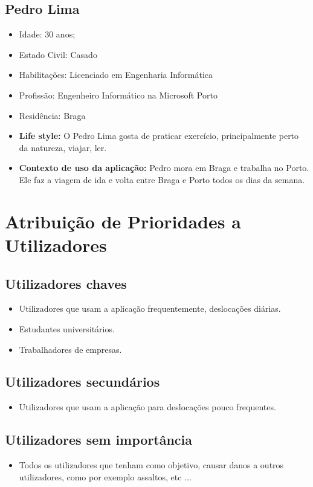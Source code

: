\subsection{Pedro Lima}
\begin{itemize}
    \item Idade: 30 anos;
    \item Estado Civil: Casado
    \item Habilitações: Licenciado em Engenharia Informática
    \item Profissão: Engenheiro Informático na Microsoft Porto
    \item Residência: Braga
    \item \textbf{Life style:} O Pedro Lima gosta de praticar exercício, principalmente perto da natureza, viajar, ler. 
    \item \textbf{Contexto de uso da aplicação:} Pedro mora em Braga e trabalha no Porto. Ele faz a viagem de ida e volta entre Braga e Porto todos os dias da semana.
    
\end{itemize}{}

\section{Atribuição de Prioridades a Utilizadores}

\subsection{Utilizadores chaves}
\begin{itemize}
    \item Utilizadores que usam a aplicação frequentemente, deslocações diárias.
    \item Estudantes universitários.
    \item Trabalhadores de empresas.
\end{itemize}{}
\subsection{Utilizadores secundários}
\begin{itemize}
    \item Utilizadores que usam a aplicação para deslocações pouco frequentes.
\end{itemize}{}
\subsection{Utilizadores sem importância}
\begin{itemize}
    \item Todos os utilizadores que tenham como objetivo, causar danos a outros utilizadores, como por exemplo assaltos, etc ...
\end{itemize}{}

